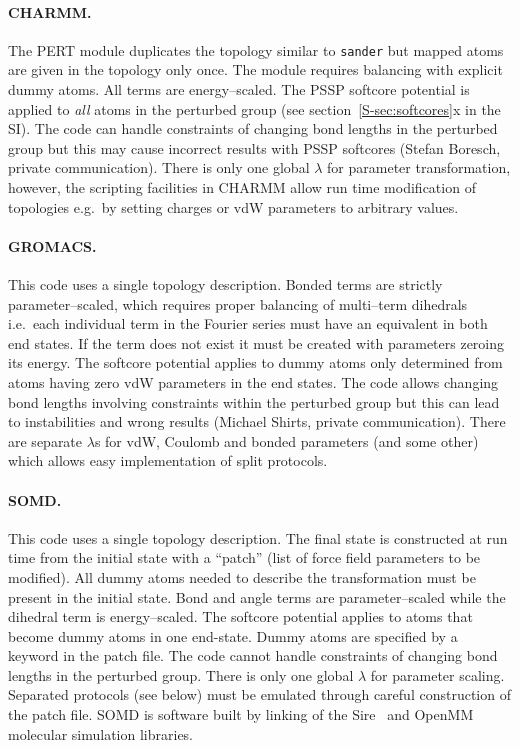 \documentclass[journal=jctcce,manuscript=article]{achemso}
\newcommand{\progname}[1]{\texttt{#1}}
\begin{document}
\paragraph{CHARMM.} The PERT module duplicates the topology similar to
\progname{sander} but mapped atoms are given in the topology only once.
The module requires balancing with explicit dummy atoms.  All terms are
energy--scaled.  The PSSP softcore potential is applied to \emph{all}
atoms in the perturbed group (see section~\ref{S-sec:softcores}x in the SI).  
The 
code can handle constraints of changing bond lengths in the perturbed group but 
this
may cause incorrect results with PSSP softcores (Stefan Boresch, private
communication).  There is only one global $\lambda$ for parameter
transformation, however, the scripting facilities in CHARMM allow run time
modification of topologies e.g.\ by setting charges or vdW parameters
to arbitrary values.

\paragraph{GROMACS.} This code uses a single topology description.
Bonded terms are strictly parameter--scaled, which requires proper
balancing of multi--term dihedrals i.e.\ each individual term in the Fourier 
series must have an equivalent in both end states.  If the term does not exist 
it must be created with parameters zeroing its energy.
The softcore potential applies to dummy 
atoms only determined from atoms having zero vdW parameters in the end states.
The code allows changing bond lengths involving constraints within the perturbed group  but this can lead to instabilities and wrong results (Michael Shirts, private communication).  There are separate $\lambda$s for vdW,
Coulomb and bonded parameters (and some other) which allows easy implementation 
of split protocols.

\paragraph{SOMD.} This code uses a single topology description.
The final state is constructed at run time from the initial state with
a ``patch'' (list of force field parameters to be modified). All dummy atoms
needed to describe the transformation must be present in the initial state. 
Bond and angle terms are parameter--scaled while the dihedral term is
energy--scaled.  The softcore potential applies to atoms that become dummy atoms
 in one end-state. Dummy atoms are specified by a keyword in the patch file.
The code cannot handle constraints of changing bond lengths in the
perturbed group.  There is only one global $\lambda$ for parameter
scaling.  Separated protocols (see below) must be emulated through
careful construction of the patch file.  SOMD is software built by linking of
the Sire~\cite{Sire-2016} and OpenMM~\cite{doi:10.1021/ct300857j} molecular
simulation libraries.
\end{document}
